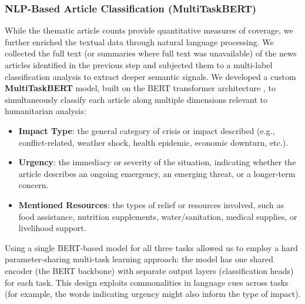 \documentclass{article}
\begin{document}
\subsubsection{NLP-Based Article Classification (MultiTaskBERT)}
While the thematic article counts provide quantitative measures of coverage, we further enriched the textual data through natural language processing. We collected the full text (or summaries where full text was unavailable) of the news articles identified in the previous step and subjected them to a multi-label classification analysis to extract deeper semantic signals. We developed a custom \textbf{MultiTaskBERT} model, built on the BERT transformer architecture \citep{devlin2019bert}, to simultaneously classify each article along multiple dimensions relevant to humanitarian analysis:
\begin{itemize}\itemsep0em 
    \item \textbf{Impact Type}: the general category of crisis or impact described (e.g., conflict-related, weather shock, health epidemic, economic downturn, etc.).
    \item \textbf{Urgency}: the immediacy or severity of the situation, indicating whether the article describes an ongoing emergency, an emerging threat, or a longer-term concern.
    \item \textbf{Mentioned Resources}: the types of relief or resources involved, such as food assistance, nutrition supplements, water/sanitation, medical supplies, or livelihood support.
\end{itemize}
Using a single BERT-based model for all three tasks allowed us to employ a hard parameter-sharing multi-task learning approach: the model has one shared encoder (the BERT backbone) with separate output layers (classification heads) for each task. This design exploits commonalities in language cues across tasks (for example, the words indicating urgency might also inform the type of impact).
\end{document}
